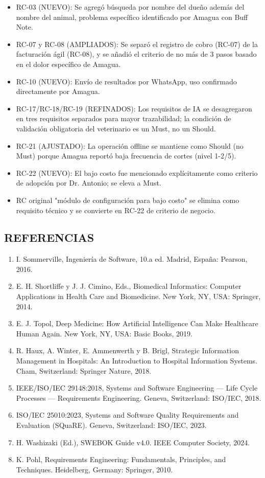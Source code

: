 \documentclass[
]{article}
\begin{document}
\begin{itemize}
\item
  RC-03 (NUEVO): Se agregó búsqueda por nombre del dueño además del
  nombre del animal, problema específico identificado por Amagua con
  Buff Note.
\item
  RC-07 y RC-08 (AMPLIADOS): Se separó el registro de cobro (RC-07) de
  la facturación ágil (RC-08), y se añadió el criterio de no más de 3
  pasos basado en el dolor específico de Amagua.
\item
  RC-10 (NUEVO): Envío de resultados por WhatsApp, uso confirmado
  directamente por Amagua.
\item
  RC-17/RC-18/RC-19 (REFINADOS): Los requisitos de IA se desagregaron en
  tres requisitos separados para mayor trazabilidad; la condición de
  validación obligatoria del veterinario es un Must, no un Should.
\item
  RC-21 (AJUSTADO): La operación offline se mantiene como Should (no
  Must) porque Amagua reportó baja frecuencia de cortes (nivel 1-2/5).
\item
  RC-22 (NUEVO): El bajo costo fue mencionado explícitamente como
  criterio de adopción por Dr. Antonio; se eleva a Must.
\item
  RC original "módulo de configuración para bajo costo" se elimina como
  requisito técnico y se convierte en RC-22 de criterio de negocio.
\end{itemize}

\subsection{REFERENCIAS}\label{referencias-1}

\begin{enumerate}
\def\labelenumi{\arabic{enumi}.}
\item
  I. Sommerville, Ingeniería de Software, 10.a ed. Madrid, España:
  Pearson, 2016.
\item
  E. H. Shortliffe y J. J. Cimino, Eds., Biomedical Informatics:
  Computer Applications in Health Care and Biomedicine. New York, NY,
  USA: Springer, 2014.
\item
  E. J. Topol, Deep Medicine: How Artificial Intelligence Can Make
  Healthcare Human Again. New York, NY, USA: Basic Books, 2019.
\item
  R. Haux, A. Winter, E. Ammenwerth y B. Brigl, Strategic Information
  Management in Hospitals: An Introduction to Hospital Information
  Systems. Cham, Switzerland: Springer Nature, 2018.
\item
  IEEE/ISO/IEC 29148:2018, Systems and Software Engineering --- Life
  Cycle Processes --- Requirements Engineering. Geneva, Switzerland:
  ISO/IEC, 2018.
\item
  ISO/IEC 25010:2023, Systems and Software Quality Requirements and
  Evaluation (SQuaRE). Geneva, Switzerland: ISO/IEC, 2023.
\item
  H. Washizaki (Ed.), SWEBOK Guide v4.0. IEEE Computer Society, 2024.
\item
  K. Pohl, Requirements Engineering: Fundamentals, Principles, and
  Techniques. Heidelberg, Germany: Springer, 2010.
\end{enumerate}
\end{document}
